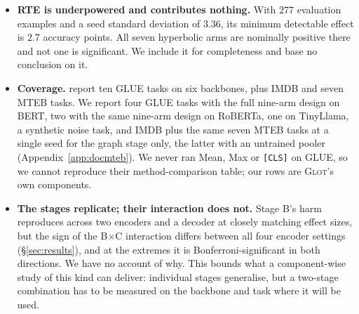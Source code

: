 \documentclass{article}
\begin{document}
\begin{itemize}
      A reduced design --- four arms, confirmation seeds only, reusing the
      CoLA-selected configuration --- brings SST-2 to roughly $21$ GPU-hours and
      is the single most valuable experiment this paper is missing.
\item \textbf{RTE is underpowered and contributes nothing.} With $277$
      evaluation examples and a seed standard deviation of $3.36$, its minimum
      detectable effect is $2.7$ accuracy points. All seven hyperbolic arms are
      nominally positive there and not one is significant. We include it for
      completeness and base no conclusion on it.
\item \textbf{Coverage.} \citet{mantri2026glot} report ten GLUE tasks on six
      backbones, plus IMDB and seven MTEB tasks. We report four GLUE tasks with
      the full nine-arm design on BERT, two with the same nine-arm design on
      RoBERTa, one on TinyLlama, a
      synthetic noise task, and IMDB plus the same seven MTEB tasks at a single
      seed for the graph stage only, the latter with an untrained pooler
      (Appendix~\ref{app:docmteb}). We never ran
      Mean, Max or \texttt{[CLS]} on GLUE, so we cannot reproduce their
      method-comparison table; our rows are \textsc{Glot}'s own components.
\item \textbf{The stages replicate; their interaction does not.} Stage B's harm
      reproduces across two encoders and a decoder at closely matching effect
      sizes, but the sign of the B$\times$C interaction differs between all four
      encoder settings (\S\ref{sec:results}), and at the extremes it is
      Bonferroni-significant in both directions. We have no account of why. This
      bounds what a component-wise study of this kind can deliver: individual
      stages generalise, but a two-stage combination has to be measured on the
      backbone and task where it will be used.
\end{itemize}
\end{document}
